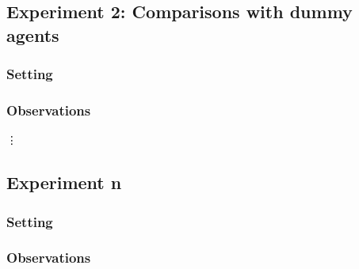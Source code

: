 \documentclass[11pt]{article}
\begin{document}
\subsection{Experiment 2: Comparisons with dummy agents}

\subsubsection{Setting}

\subsubsection{Observations}

\vdots

\subsection{Experiment n}

\subsubsection{Setting}

\subsubsection{Observations}
\end{document}
